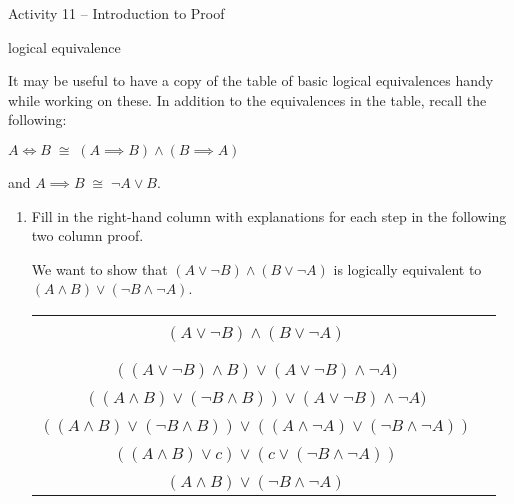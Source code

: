 \documentclass{amsart}
\begin{document}
\thispagestyle{empty}

\centerline{\Large Activity 11 -- Introduction to Proof}
\centerline{\large logical equivalence}

\bigskip
\Large

It may be useful to have a copy of the table of basic logical equivalences handy while working on these.  In addition to the equivalences in the table, recall the following:

$A \iff B \; \cong \; (A \implies B) \land (B \implies A)$ 

and $A \implies B \; \cong \; \lnot A \lor B$.

\vspace{.2in}

\begin{enumerate}

\item Fill in the right-hand column with explanations for each step in the following two column proof.

We want to show that $(A \lor \lnot B) \land (B \lor \lnot A)$ is logically equivalent to $(A \land B) \lor (\lnot B \land \lnot A)$.

\vspace{.5in}

\hspace{-1in} \begin{tabular}{c | c}
$(A \lor \lnot B) \land (B \lor \lnot A)$ & \rule{2.5in}{0in} \\
\rule{0pt}{18pt} & \\
$((A \lor \lnot B) \land B) \lor (A \lor \lnot B) \land \lnot A)$ & \\
\rule{0pt}{18pt} & \\
$((A \land B) \lor (\lnot B \land B) ) \lor (A \lor \lnot B) \land \lnot A)$ & \\
\rule{0pt}{18pt} & \\
$((A \land B) \lor (\lnot B \land B) ) \lor ((A \land \lnot A) \lor (\lnot B \land \lnot A)) $ & \\
\rule{0pt}{18pt} & \\
$((A \land B) \lor c ) \lor (c \lor (\lnot B \land \lnot A)) $ & \\
\rule{0pt}{18pt} & \\
$(A \land B)  \lor (\lnot B \land \lnot A) $ & \\
\end{tabular}

\vspace{.5in}


\end{enumerate}
\end{document}
